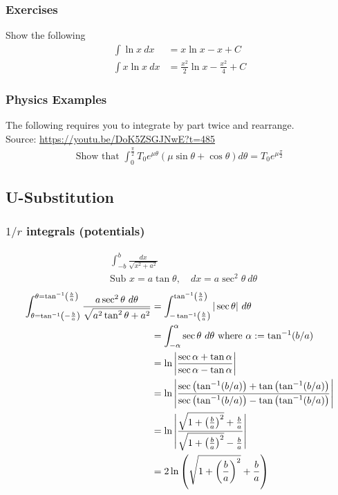\documentclass{article}
\begin{document}
\subsubsection{Exercises}
Show the following
\begin{align}
    \int \ln x \ dx &= x \ln x - x + C \\
    \int x \ln x \ dx &= \frac{x^2}{2} \ln x - \frac{x^2}{4} + C
\end{align}
\subsubsection{Physics Examples}

The following requires you to integrate by part twice and rearrange. \\
\noindent Source: \url{https://youtu.be/DoK5ZSGJNwE?t=485}
\begin{align}
    \text{Show that }\int_0^{\frac{\pi}{2}} T_0 e^{\mu \theta}(\mu \sin \theta+\cos \theta) d \theta = T_0 e^{\mu \frac{\pi}{2}}
\end{align}
\subsection{U-Substitution}
\subsubsection{$1/r$ integrals (potentials)}
\label{sec:potential_integral}
\begin{align}
& \int_{-b}^b \frac{d x}{\sqrt{x^2+a^2}} \\
& \text{Sub } x=a \tan \theta, \quad d x=a \sec ^2 \theta\ d \theta 
\end{align}
\begin{align}
\int_{\theta=\tan ^{-1}\left(-\frac{b}{a}\right)}^{\theta=\tan ^{-1}\left(\frac{b}{a}\right)} \frac{a \sec ^2 \theta\ d \theta}{\sqrt{a^2 \tan ^2 \theta+a^2}} &= \int_{-\tan ^{-1}\left(\frac{b}{a}\right)}^{\tan ^{-1}\left(\frac{b}{a}\right)}|\sec \theta|\ d \theta \\ 
& =\int_{-\alpha}^\alpha \sec \theta\ d \theta \text{    where } \alpha := \tan^{-1}(b/a) \notag \\
&= \ln \left| \frac{\sec \alpha + \tan \alpha}{\sec \alpha - \tan \alpha}\right| \\
&= \ln \left| \frac{\sec \left(\tan^{-1}(b/a)\right) + \tan \left(\tan^{-1}(b/a)\right)}{\sec \left(\tan^{-1}(b/a)\right) - \tan \left(\tan^{-1}(b/a)\right)}\right| \notag \\
&= \ln \left| \frac{\sqrt{1+\left(\frac{b}{a}\right)^2} + \frac{b}{a}}{\sqrt{1+\left(\frac{b}{a}\right)^2} - \frac{b}{a}}\right| \notag \\
&= 2 \ln \left( \sqrt{1+\left(\frac{b}{a}\right)^2} + \frac{b}{a} \right)
\end{align}
\end{document}
